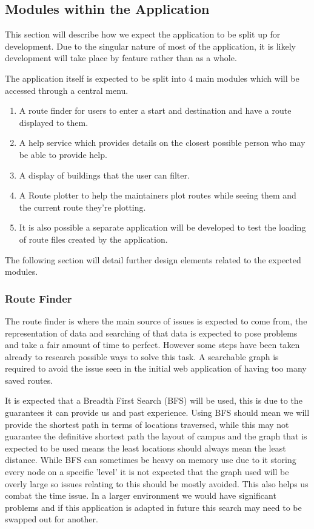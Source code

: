 \documentclass[10pt,a4paper]{article}
\begin{document}
\subsection{Modules within the Application}
This section will describe how we expect the application to be split up for development. Due to the singular nature of most of the application, it is likely development will take place by feature rather than as a whole.

The application itself is expected to be split into 4 main modules which will be accessed through a central menu. 
\begin{enumerate}
\item A route finder for users to enter a start and destination and have a route displayed to them.
\item A help service which provides details on the closest possible person who may be able to provide help.
\item A display of buildings that the user can filter.
\item A Route plotter to help the maintainers plot routes while seeing them and the current route they're plotting. 
\item It is also possible a separate application will be developed to test the loading of route files created by the application.
\end{enumerate}
The following section will detail further design elements related to the expected modules.
\subsubsection{Route Finder}
The route finder is where the main source of issues is expected to come from, the representation of data and searching of that data is expected to pose problems and take a fair amount of time to perfect. However some steps have been taken already to research possible ways to solve this task. A searchable graph is required to avoid the issue seen in the initial web application of having too many saved routes. 

It is expected that a Breadth First Search (BFS) will be used, this is due to the guarantees it can provide us and past experience. Using BFS should mean we will provide the shortest path in terms of locations traversed, while this may not guarantee the definitive shortest path the layout of campus and the graph that is expected to be used means the least locations should always mean the least distance. While BFS can sometimes be heavy on memory use due to it storing every node on a specific 'level' it is not expected that the graph used will be overly large so issues relating to this should be mostly avoided. This also helps us combat the time issue. In a larger environment we would have significant problems and if this application is adapted in future this search may need to be swapped out for another.
\end{document}
